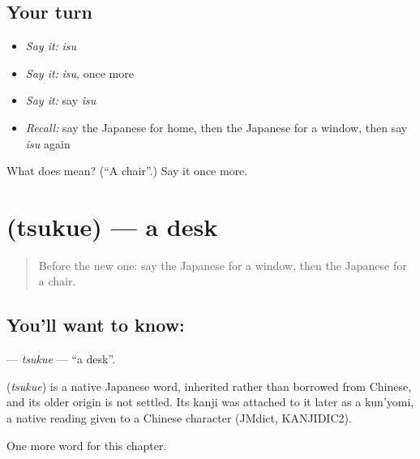 \subsection*{Your turn}
\begin{itemize}
\raggedright
  \item \emph{Say it:} \emph{isu}
  \item \emph{Say it:} \emph{isu}, once more
  \item \emph{Say it:} say \emph{isu}
  \item \emph{Recall:} say the Japanese for home, then the Japanese for a window, then say \emph{isu} again
\end{itemize}

\begin{tcolorbox}[breakable,colback=teal!4,colframe=teal!35!black,title={Before you move on}]
What does  mean? (\textquotedblleft{}A chair\textquotedblright{}.) Say it once more.
\end{tcolorbox}
\section[\texorpdfstring{\ja{つくえ} (tsukue)}{つくえ (tsukue)}]{ (tsukue) — a desk}

\label{lesson:JA-C37-tsukue}



\begin{quote}
Before the new one: say the Japanese for a window, then the Japanese for a chair.
\end{quote}

\subsection*{You'll want to know: }
\textbf{} — \emph{tsukue} — \textquotedblleft{}a desk\textquotedblright{}.

\begin{cousinweb}
\textbf{} (\emph{tsukue}) is a native Japanese word, inherited rather than borrowed from Chinese, and its older origin is not settled. Its kanji was attached to it later as a kun'yomi, a native reading given to a Chinese character (JMdict, KANJIDIC2).
\end{cousinweb}

\begin{grammarlens}[title={What you've built}]
One more word for this chapter.
\end{grammarlens}

